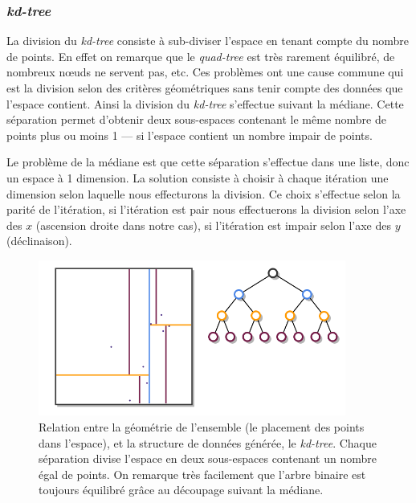 		\subsubsection{\emph{kd-tree}}

La division du \emph{kd-tree} consiste à sub-diviser l'espace en tenant compte du nombre de points. En effet on remarque que le \emph{quad-tree} est très rarement équilibré, de nombreux n\oe{}uds ne servent pas, etc. Ces problèmes ont une cause commune qui est la division selon des critères géométriques sans tenir compte des données que l'espace contient. Ainsi la division du \emph{kd-tree} s'effectue suivant la médiane. Cette séparation permet d'obtenir deux sous-espaces contenant le même nombre de points plus ou moins 1 --- si l'espace contient un nombre impair de points.

Le problème de la médiane est que cette séparation s'effectue dans une liste, donc un espace à 1 dimension. La solution consiste à choisir à chaque itération une dimension selon laquelle nous effecturons la division. Ce choix s'effectue selon la parité de l'itération, si l'itération est pair nous effectuerons la division selon l'axe des $x$ (ascension droite dans notre cas), si l'itération est impair selon l'axe des $y$ (déclinaison).

	\begin{figure}[h]
		\centering
		\includegraphics[width=0.9\textwidth]{img/kdtree.png}
		\caption[Relation entre la géométrie de l'ensemble et le \emph{kd-tree} généré]{Relation entre la géométrie de l'ensemble (le placement des points dans l'espace), et la structure de données générée, le \emph{kd-tree}. Chaque séparation divise l'espace en deux sous-espaces contenant un nombre égal de points. On remarque très facilement que l'arbre binaire est toujours équilibré grâce au découpage suivant la médiane.}
		\label{fig:kdtree}
	\end{figure}

